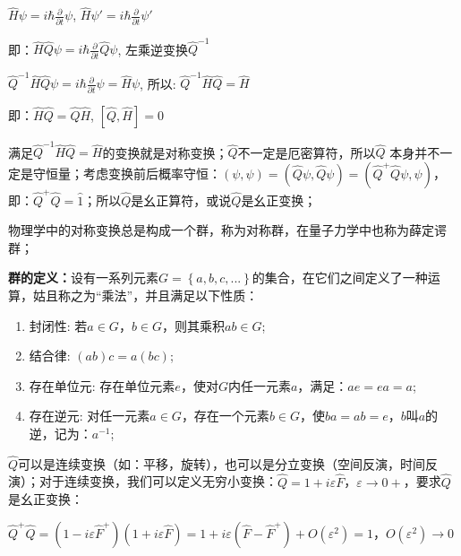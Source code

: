 $\widehat H\psi  = i\hbar \frac{\partial }{{\partial t}}\psi $, $\widehat H\psi ' = i\hbar \frac{\partial }{{\partial t}}\psi '$

即：$\widehat H\widehat Q\psi  = i\hbar \frac{\partial }{{\partial t}}\widehat Q\psi $, 左乘逆变换$\widehat Q^{ - 1} $

$\widehat Q^{ - 1} \widehat H\widehat Q\psi  = i\hbar \frac{\partial }{{\partial t}}\psi  = \widehat H\psi $, 所以: $\widehat Q^{ - 1} \widehat H\widehat Q = \widehat H$

即：$\widehat H\widehat Q = \widehat Q\widehat H$, $\left[ {\widehat Q,\widehat H} \right] = 0$

满足$\widehat Q^{ - 1} \widehat H\widehat Q = \widehat H$的变换就是对称变换；$\hat Q$不一定是厄密算符，所以$\hat Q$ 本身并不一定是守恒量；考虑变换前后概率守恒：$\left( {\psi ,\psi } \right) = \left( {\widehat Q\psi ,\widehat Q\psi } \right) = \left( {\widehat Q^ +  \widehat Q\psi ,\psi } \right)$，即：$\widehat Q^ +  \widehat Q = \widehat 1$；所以$\hat Q$是幺正算符，或说$\hat Q$是幺正变换；

物理学中的对称变换总是构成一个群，称为对称群，在量子力学中也称为薛定谔群；



\textbf{群的定义：}设有一系列元素$G = \left\{ {a,b,c,...} \right\}$的集合，在它们之间定义了一种运算，姑且称之为``乘法''，并且满足以下性质：

\begin{enumerate}
    \item 封闭性: 若$a \in G$，$b \in G$，则其乘积$ab \in G$;
    \item 结合律: $(ab)c = a(bc)$;
    \item 存在单位元: 存在单位元素$e$，使对$G$内任一元素$a$，满足：$ae = ea = a$;
    \item 存在逆元: 对任一元素$a \in G$，存在一个元素$b \in G$，使$ba = ab = e$，$b$叫$a$的逆，记为：$a^{ - 1} $;
   \end{enumerate}

$\hat Q$可以是连续变换（如：平移，旋转），也可以是分立变换（空间反演，时间反演）；对于连续变换，我们可以定义无穷小变换：$\widehat Q = 1 + i\varepsilon \widehat F$，$\varepsilon  \to 0 + $，要求$\hat Q$是幺正变换：

$\widehat Q^ +  \widehat Q = \left( {1 - i\varepsilon \widehat F^ +  } \right)\left( {1 + i\varepsilon \widehat F} \right) = 1 + i\varepsilon \left( {\widehat F - \widehat F^ +  } \right) + O\left( {\varepsilon ^2 } \right) = 1$，$O\left( {\varepsilon ^2 } \right) \to 0$

